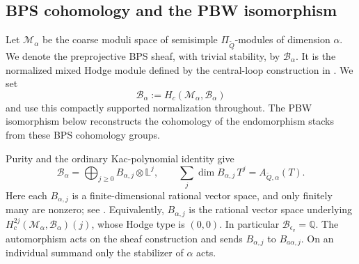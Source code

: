\documentclass[11pt, reqno]{amsart}
\numberwithin{equation}{section}
\theoremstyle{definition}
\theoremstyle{remark}
\newcommand{\mb}[1]{\mathbb{#1}}
\newcommand{\mc}[1]{\mathcal{#1}}
\newcommand{\ms}[1]{\mathscr{#1}}
\newcommand{\Qbar}{\widetilde Q}
\begin{document}
\subsection{BPS cohomology and the PBW isomorphism}\label{subsec:bps-objects}
Let $\mc M_\alpha$ be the coarse moduli space of semisimple
$\Pi_{\Qbar}$-modules of dimension $\alpha$. We denote the
preprojective BPS sheaf, with trivial stability, by $\ms B_\alpha$.
It is the normalized mixed Hodge module defined by the central-loop
construction in \cite[Theorem~B]{DavisonStacks}.
We set
\[ \mc B_\alpha:=H_c(\mc M_\alpha,\ms B_\alpha) \]
and use this compactly supported normalization throughout.
The PBW isomorphism below reconstructs the cohomology of the
endomorphism stacks from these BPS cohomology groups.

Purity and the ordinary Kac-polynomial identity give
\begin{equation}\label{eq:primitive-normalization} \mc B_\alpha=\bigoplus_{j\geq0}B_{\alpha,j}\otimes\mb L^j, \qquad \sum_j\dim B_{\alpha,j}\,T^j=A_{\Qbar,\alpha}(T).\end{equation}
Here each $B_{\alpha,j}$ is a finite-dimensional rational vector space,
and only finitely many are nonzero; see
\cite[Sections~8.1--8.2, equations~(78)--(79)]{DavisonStacks}.
Equivalently, $B_{\alpha,j}$ is the rational vector space underlying
$H_c^{2j}(\mc M_\alpha,\ms B_\alpha)(j)$, whose Hodge type
is $(0,0)$. In particular $\mc B_{\epsilon_v}=\mb Q$.
The automorphism acts on the sheaf construction and sends $B_{\alpha,j}$ to
$B_{a\alpha,j}$. On an individual summand only the stabilizer of
$\alpha$ acts.
\end{document}
